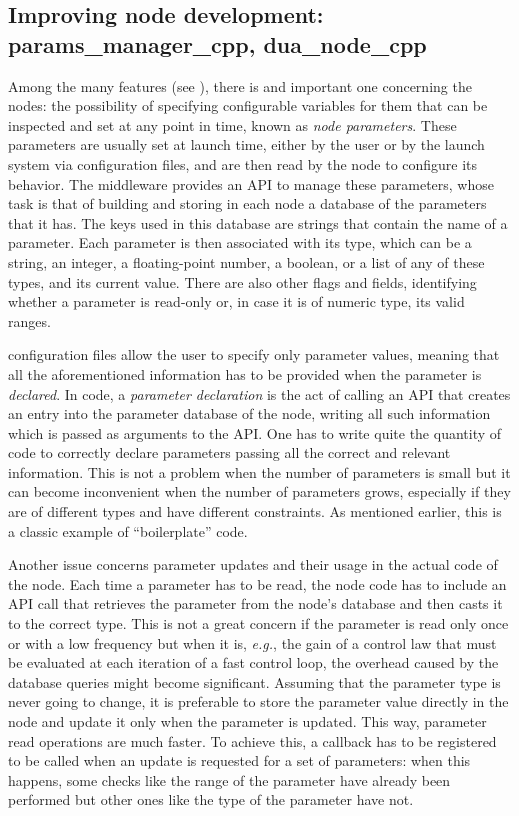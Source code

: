 \subsection{Improving node development: params\_manager\_cpp, dua\_node\_cpp}
\label{sec:params_manager_dua_node}
Among the many \ROS features (see ), there is and important one concerning the nodes: the possibility of specifying configurable variables for them that can be inspected and set at any point in time, known as \emph{node parameters}. These parameters are usually set at launch time, either by the user or by the launch system via configuration files, and are then read by the node to configure its behavior. The \ROS middleware provides an API to manage these parameters, whose task is that of building and storing in each node a database of the parameters that it has. The keys used in this database are strings that contain the name of a parameter. Each parameter is then associated with its type, which can be a string, an integer, a floating-point number, a boolean, or a list of any of these types, and its current value. There are also other flags and fields, identifying whether a parameter is read-only or, in case it is of numeric type, its valid ranges.

\ROS configuration files allow the user to specify only parameter values, meaning that all the aforementioned information has to be provided when the parameter is \emph{declared}. In \ROS code, a \emph{parameter declaration} is the act of calling an API that creates an entry into the parameter database of the node, writing all such information which is passed as arguments to the API. One has to write quite the quantity of code to correctly declare parameters passing all the correct and relevant information. This is not a problem when the number of parameters is small but it can become inconvenient when the number of parameters grows, especially if they are of different types and have different constraints. As mentioned earlier, this is a classic example of ``boilerplate'' code.

Another issue concerns parameter updates and their usage in the actual code of the node. Each time a parameter has to be read, the node code has to include an API call that retrieves the parameter from the node's database and then casts it to the correct type. This is not a great concern if the parameter is read only once or with a low frequency but when it is, \emph{e.g.}, the gain of a control law that must be evaluated at each iteration of a fast control loop, the overhead caused by the database queries might become significant. Assuming that the parameter type is never going to change, it is preferable to store the parameter value directly in the node and update it only when the parameter is updated. This way, parameter read operations are much faster. To achieve this, a callback has to be registered to be called when an update is requested for a set of parameters: when this happens, some checks like the range of the parameter have already been performed but other ones like the type of the parameter have not.


